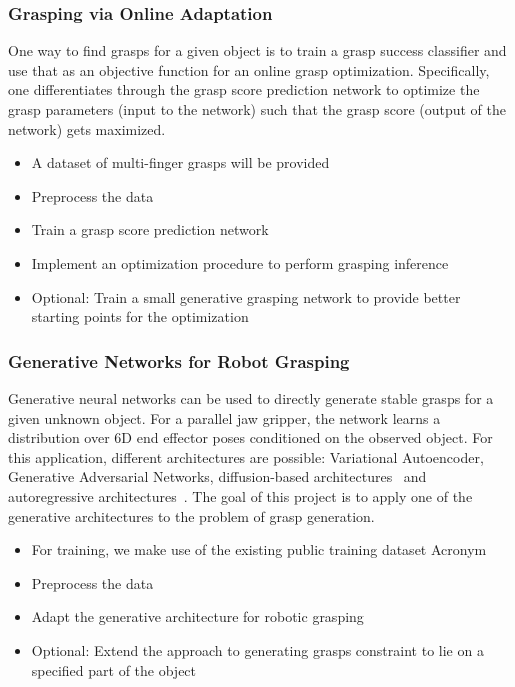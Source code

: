 \documentclass[a4paper]{article}
\begin{document}
\subsubsection{Grasping via Online Adaptation}
One way to find grasps for a given object is to train a grasp success classifier and use that as an objective function for an online grasp optimization.
Specifically, one differentiates through the grasp score prediction network to optimize the grasp parameters (input to the network) such that the grasp score (output of the network) gets maximized.

\begin{itemize}
  \item A dataset of multi-finger grasps will be provided~\cite{winkelbauer2022}
  \item Preprocess the data
  \item Train a grasp score prediction network~\cite{van2020learning}
  \item Implement an optimization procedure to perform grasping inference
  \item Optional: Train a small generative grasping network to provide better starting points for the optimization
\end{itemize}


\subsubsection{Generative Networks for Robot Grasping}
Generative neural networks can be used to directly generate stable grasps for a given unknown object.
For a parallel jaw gripper, the network learns a distribution over 6D end effector poses conditioned on the observed object.
For this application, different architectures are possible: Variational Autoencoder, Generative Adversarial Networks, diffusion-based architectures~\cite{ho2020denoising} and autoregressive architectures~\cite{winkelbauer2022}.
The goal of this project is to apply one of the generative architectures to the problem of grasp generation.
\begin{itemize}
  \item For training, we make use of the existing public training dataset Acronym~\cite{acronym2020}
  \item Preprocess the data
  \item Adapt the generative architecture for robotic grasping
  \item Optional: Extend the approach to generating grasps constraint to lie on a specified part of the object~\cite{lundell2023constrained}
\end{itemize}
\end{document}
